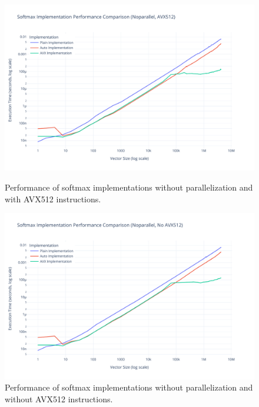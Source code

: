 \documentclass[10pt]{report}
\begin{document}
\begin{figure}[H]
  \centering
  \begin{minipage}{0.49\textwidth}
    \centering
    \includegraphics[width=\textwidth]{../images/performance/softmax_noparallel_avx512.pdf}
    \caption{Performance of softmax implementations without parallelization and with AVX512 instructions.}
    \label{fig:perf_noparallel_avx512}
  \end{minipage}
  \hfill
  \begin{minipage}{0.49\textwidth}
    \centering
    \includegraphics[width=\textwidth]{../images/performance/softmax_noparallel_noavx512.pdf}
    \caption{Performance of softmax implementations without parallelization and without AVX512 instructions.}
    \label{fig:perf_noparallel_noavx512}
  \end{minipage}
\end{figure}
\end{document}
